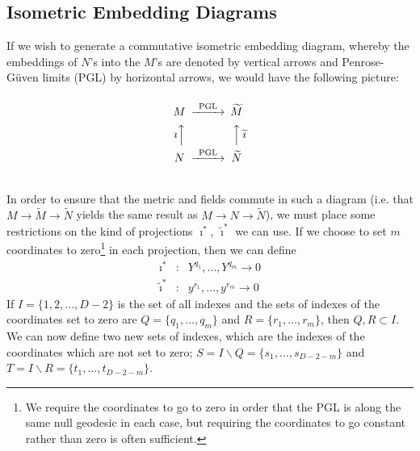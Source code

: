 \documentclass[11pt, a4paper, titlepage]{article}
\begin{document}
\subsection{Isometric Embedding Diagrams}
\label{bpg:ie}
If we wish to generate a commutative isometric embedding diagram, whereby the
embeddings of $N$'s into the $M$'s are denoted by vertical arrows and
Penrose-G\"{u}ven limits (PGL) by horizontal arrows, we would have the following
picture:
\begin{equation}
  \label{eq:bpg:ie:generic}
  \begin{CD}
    @.\\
    M @>\text{PGL}>>                      \widetilde{M}\\
    \text{$\imath$}@AAA @AAA\text{$\widetilde{\imath}$}\\
    N @>\text{PGL}>>                      \widetilde{N}\\
    @.
  \end{CD}
\end{equation}
In order to ensure that the metric and fields commute in such a diagram (i.e.
that $M\rightarrow \widetilde{M} \rightarrow \widetilde{N}$ yields the same
result as $M\rightarrow N\rightarrow\widetilde{N}$), we must place some
restrictions on the kind of projections $\imath^*$, $\widetilde{\imath}^*$ we
can use. If we choose to set $m$ coordinates to zero\footnote{We require the
  coordinates to go to zero in order that the PGL is along the same null
  geodesic in each case, but requiring the coordinates to go constant rather
  than zero is often sufficient.} in each projection, then we can define
\begin{eqnarray}
  \label{eq:bpg:ie:i1}
  \imath^*&:& Y^{q_1},\ldots,Y^{q_m} \rightarrow 0\\
  \label{eq:bpg:ie:i2}
  \widetilde{\imath}^*&:& y^{r_1},\ldots,y^{r_m} \rightarrow 0
\end{eqnarray}
If $I=\{1,2,\ldots,D-2\}$ is the set of all indexes and the sets of indexes of
the coordinates set to zero are $Q=\{q_1,\ldots,q_m\}$ and
$R=\{r_1,\ldots,r_m\}$, then $Q,R\subset I$. We can now define two new sets of
indexes, which are the indexes of the coordinates which are not set to zero;
$S=I\backslash Q=\{s_1,\ldots,s_{D-2-m}\}$ and $T=I\backslash
R=\{t_1,\ldots,t_{D-2-m}\}$.
\end{document}

